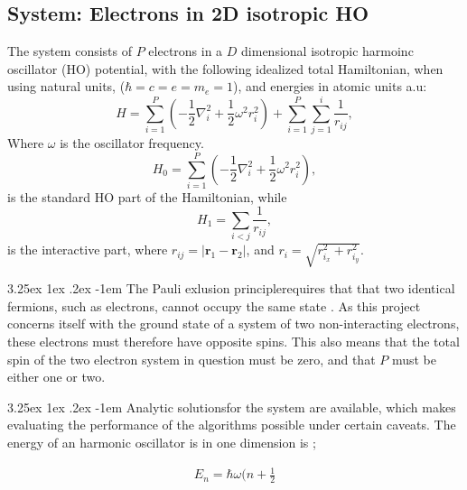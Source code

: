 \documentclass[%
oneside,                 %
final,                   %
10pt]{article}
\makeatletter
\renewcommand\paragraph{\@startsection{paragraph}{5}{\z@}%
  {3.25ex \@plus1ex \@minus.2ex}%
  {-1em}%
  {\normalfont\normalsize\bfseries}}
\makeatother
\begin{document}
\subsection{System: Electrons in 2D isotropic HO}
The system consists of $P$ electrons in a $D$ dimensional isotropic harmoinc oscillator (HO) potential, with the following idealized total Hamiltonian, when using natural units, ($\hbar=c=e=m_e=1$), and energies in  atomic units a.u:
\begin{equation}
\label{eq:finalH}
H=\sum_{i=1}^{P} \left(  -\frac{1}{2} \nabla_i^2 + \frac{1}{2} \omega^2r_i^2  \right)+\sum_{i=1}^P \sum_{j=1}^i \frac{1}{r_{ij}},
\end{equation}
Where $\omega$ is the oscillator frequency. 
\begin{equation*}
H_0=\sum_{i=1}^{P} \left(  -\frac{1}{2} \nabla_i^2 + \frac{1}{2} \omega^2r_i^2  \right),
\end{equation*}
is the standard HO part of the Hamiltonian, while
\begin{equation*}
H_1=\sum_{i<j}\frac{1}{r_{ij}},
\end{equation*}
is the interactive part, where $r_{ij}=\vert \bm{r}_1-\bm{r}_2\vert$, and $r_i = \sqrt{r_{i_x}^2+r_{i_y}^2}$.

\paragraph{The Pauli exlusion principle}requires that that two identical fermions, such as electrons, cannot occupy the same state \citep{Griffiths95}. As this project concerns itself with the ground state of a system of two non-interacting electrons, these electrons must therefore have opposite spins. This also means that the total spin of the two electron system in question must be zero, and that $P$ must be either one or two.

\paragraph{Analytic solutions}for the system are available, which makes evaluating the performance of the algorithms possible under certain caveats.  The energy of an harmonic oscillator is in one dimension is \citep{Griffiths95};

\begin{equation}
\begin{aligned}
E_n = \hbar \omega (n+\frac{1}{2}
\end{aligned}
\end{equation}
\end{document}
